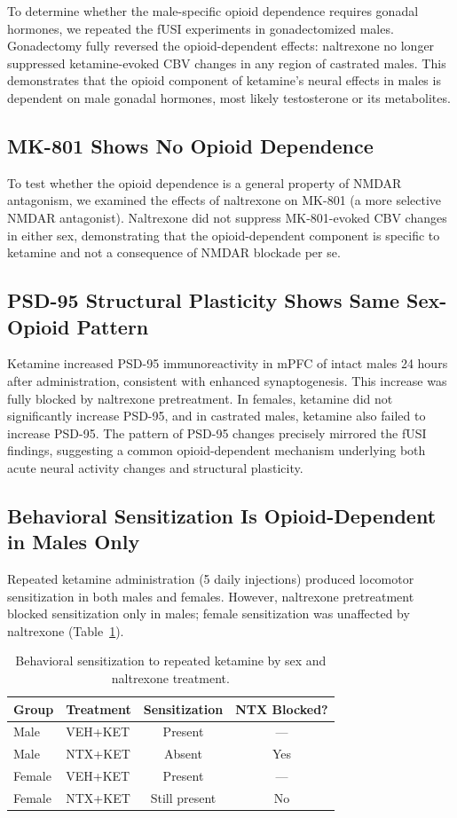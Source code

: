 \documentclass[11pt]{article}
\begin{document}
To determine whether the male-specific opioid dependence requires gonadal hormones, we repeated the fUSI experiments in gonadectomized males. Gonadectomy fully reversed the opioid-dependent effects: naltrexone no longer suppressed ketamine-evoked CBV changes in any region of castrated males. This demonstrates that the opioid component of ketamine's neural effects in males is dependent on male gonadal hormones, most likely testosterone or its metabolites.

\subsection{MK-801 Shows No Opioid Dependence}

To test whether the opioid dependence is a general property of NMDAR antagonism, we examined the effects of naltrexone on MK-801 (a more selective NMDAR antagonist). Naltrexone did not suppress MK-801-evoked CBV changes in either sex, demonstrating that the opioid-dependent component is specific to ketamine and not a consequence of NMDAR blockade per se.

\subsection{PSD-95 Structural Plasticity Shows Same Sex-Opioid Pattern}

Ketamine increased PSD-95 immunoreactivity in mPFC of intact males 24 hours after administration, consistent with enhanced synaptogenesis. This increase was fully blocked by naltrexone pretreatment. In females, ketamine did not significantly increase PSD-95, and in castrated males, ketamine also failed to increase PSD-95. The pattern of PSD-95 changes precisely mirrored the fUSI findings, suggesting a common opioid-dependent mechanism underlying both acute neural activity changes and structural plasticity.

\subsection{Behavioral Sensitization Is Opioid-Dependent in Males Only}

Repeated ketamine administration (5 daily injections) produced locomotor sensitization in both males and females. However, naltrexone pretreatment blocked sensitization only in males; female sensitization was unaffected by naltrexone (Table~\ref{tab:behavior}).

\begin{table}[h]
\centering
\caption{Behavioral sensitization to repeated ketamine by sex and naltrexone treatment.}
\label{tab:behavior}
\begin{tabular}{llcc}
\toprule
Group & Treatment & Sensitization & NTX Blocked? \\
\midrule
Male & VEH+KET & Present & --- \\
Male & NTX+KET & Absent & Yes \\
Female & VEH+KET & Present & --- \\
Female & NTX+KET & Still present & No \\
\bottomrule
\end{tabular}
\end{table}
\end{document}
